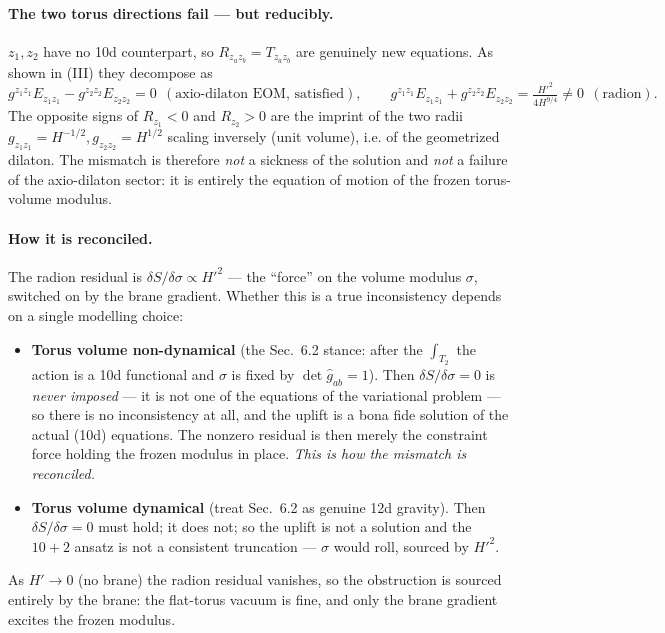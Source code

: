 \paragraph{The two torus directions fail --- but reducibly.} $z_1,z_2$ have no 10d counterpart, so
$R_{z_az_b}=T_{z_az_b}$ are genuinely new equations. As shown in (III) they decompose as
\[
g^{z_1z_1}E_{z_1z_1}-g^{z_2z_2}E_{z_2z_2}=0\ \ (\text{axio-dilaton EOM, satisfied}),\qquad
g^{z_1z_1}E_{z_1z_1}+g^{z_2z_2}E_{z_2z_2}=\tfrac{H'^2}{4H^{9/4}}\neq 0\ \ (\text{radion}).
\]
The opposite signs of $R_{z_1}<0$ and $R_{z_2}>0$ are the imprint of the two radii
$g_{z_1z_1}=H^{-1/2}, g_{z_2z_2}=H^{1/2}$ scaling inversely (unit volume), i.e. of the geometrized
dilaton. The mismatch is therefore \emph{not} a sickness of the solution and \emph{not} a failure of
the axio-dilaton sector: it is entirely the equation of motion of the frozen torus-volume modulus.

\paragraph{How it is reconciled.} The radion residual is $\delta S/\delta\sigma \propto H'^2$ --- the
``force'' on the volume modulus $\sigma$, switched on by the brane gradient. Whether this is a true
inconsistency depends on a single modelling choice:
\begin{itemize}
\item[(i)] \textbf{Torus volume non-dynamical} (the Sec.~6.2 stance: after the $\int_{T_2}$ the action
is a 10d functional and $\sigma$ is fixed by $\det\hat g_{ab}=1$). Then $\delta S/\delta\sigma=0$ is
\emph{never imposed} --- it is not one of the equations of the variational problem --- so there is no
inconsistency at all, and the uplift is a bona fide solution of the actual (10d) equations. The
nonzero residual is then merely the constraint force holding the frozen modulus in place. \emph{This
is how the mismatch is reconciled.}
\item[(ii)] \textbf{Torus volume dynamical} (treat Sec.~6.2 as genuine 12d gravity). Then
$\delta S/\delta\sigma=0$ must hold; it does not; so the uplift is not a solution and the $10+2$
ansatz is not a consistent truncation --- $\sigma$ would roll, sourced by $H'^2$.
\end{itemize}
As $H'\to 0$ (no brane) the radion residual vanishes, so the obstruction is sourced entirely by the
brane: the flat-torus vacuum is fine, and only the brane gradient excites the frozen modulus.

